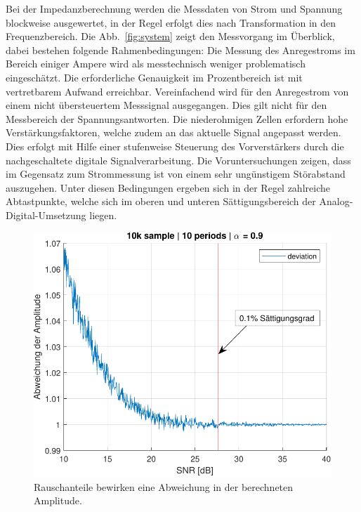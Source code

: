 \smallskip
Bei der Impedanzberechnung werden die Messdaten von Strom und Spannung blockweise ausgewertet, in der Regel erfolgt dies nach Transformation in den Frequenzbereich. Die Abb.~\ref{fig:system} zeigt den Messvorgang im Überblick, dabei bestehen folgende Rahmenbedingungen: Die Messung des Anregestroms im Bereich einiger Ampere wird als messtechnisch weniger problematisch eingeschätzt. Die erforderliche Genauigkeit im Prozentbereich ist mit vertretbarem Aufwand erreichbar. Vereinfachend wird für den Anregestrom von einem nicht übersteuertem Messsignal ausgegangen. Dies gilt nicht für den Messbereich der Spannungsantworten. Die niederohmigen Zellen erfordern hohe Verstärkungsfaktoren, welche zudem an das aktuelle Signal angepasst werden. Dies erfolgt mit Hilfe einer stufenweise Steuerung des Vorverstärkers durch die nachgeschaltete digitale Signalverarbeitung. Die Voruntersuchungen zeigen, dass im Gegensatz zum Strommessung ist von einem sehr ungünstigem Störabstand auszugehen. Unter diesen Bedingungen ergeben sich in der Regel zahlreiche Abtastpunkte, welche sich im oberen und unteren Sättigungsbereich der Analog-Digital-Umsetzung liegen.

\begin{figure}[t!] 
	\centering
	\includegraphics[width=1\columnwidth]{../img/noise-err.pdf}
	\caption{Rauschanteile bewirken eine Abweichung in der berechneten Amplitude.}
	\label{fig:Rauschanteil}
\end{figure}

